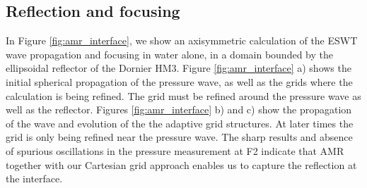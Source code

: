 \documentclass{article}
\begin{document}
\subsection{Reflection and focusing}
\label{sec:focus}
In Figure \ref{fig:amr_interface}, we show an axisymmetric calculation of the ESWT wave propagation
and focusing in water alone, in a domain bounded by the ellipsoidal reflector of the Dornier HM3.
Figure \ref{fig:amr_interface} a) shows the initial spherical propagation of the pressure wave, as
well as the grids where the calculation is being refined. The grid must be refined around the
pressure wave as well as the reflector. Figures \ref{fig:amr_interface} b) and c) show the
propagation of the wave and evolution of the the adaptive grid structures. At later times the grid
is only being refined near the pressure wave. The sharp results and absence of spurious
oscillations in the pressure measurement at F2 indicate that AMR together with our Cartesian grid
approach enables us to capture the reflection at the interface.
\end{document}
